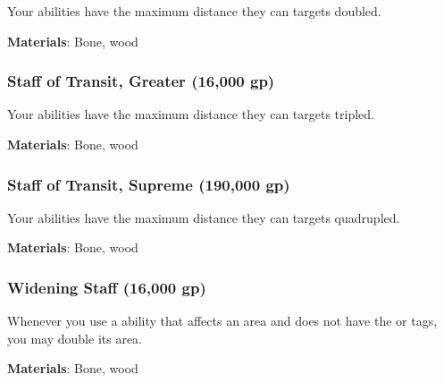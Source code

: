 Your  abilities have the maximum distance they can  targets doubled.



\vspace{0.25em}
\textbf{Materials}: Bone, wood


\lowercase{\hypertarget{item:Staff of Transit, Greater}{}}\label{item:Staff of Transit, Greater}
\hypertarget{item:Staff of Transit, Greater}{\subsubsection{Staff of Transit, Greater\hfill{} (16,000 gp)}}

Your  abilities have the maximum distance they can  targets tripled.



\vspace{0.25em}
\textbf{Materials}: Bone, wood


\lowercase{\hypertarget{item:Staff of Transit, Supreme}{}}\label{item:Staff of Transit, Supreme}
\hypertarget{item:Staff of Transit, Supreme}{\subsubsection{Staff of Transit, Supreme\hfill{} (190,000 gp)}}

Your  abilities have the maximum distance they can  targets quadrupled.



\vspace{0.25em}
\textbf{Materials}: Bone, wood


\lowercase{\hypertarget{item:Widening Staff}{}}\label{item:Widening Staff}
\hypertarget{item:Widening Staff}{\subsubsection{Widening Staff\hfill{} (16,000 gp)}}

Whenever you use a  ability that affects an area and does not have the  or  tags, you may double its area.



\vspace{0.25em}
\textbf{Materials}: Bone, wood


